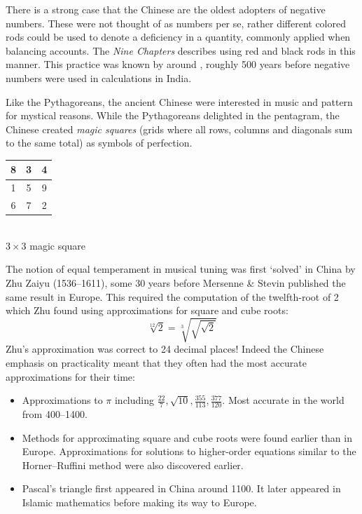 There is a strong case that the Chinese are the oldest adopters of negative numbers. These were not thought of as numbers per se, rather different colored rods could be used to denote a deficiency in a quantity, commonly applied when balancing accounts. The \emph{Nine Chapters} describes using red and black rods in this manner. This practice was known by around , roughly 500 years before negative numbers were used in calculations in India.
\smallskip


\begin{minipage}[t]{0.78\linewidth}\vspace{0pt}
 Like the Pythagoreans, the ancient Chinese were interested in music and pattern for mystical reasons. While the Pythagoreans delighted in the pentagram, the Chinese created \emph{magic squares} (grids where all rows, columns and diagonals sum to the same total) as symbols of perfection.
\end{minipage}\hfill\begin{minipage}[t]{0.2\linewidth}\vspace{0pt}
\centering\begin{tabular}{|c|c|c|}
\hline
8&3&4\\\hline
1&5&9\\\hline
6&7&2\\\hline
\end{tabular}\\[5pt]
$3\times 3$ magic square
\end{minipage}\smallbreak

The notion of equal temperament in musical tuning was first `solved' in China by Zhu Zaiyu (1536--1611), some 30 years before Mersenne \& Stevin published the same result in Europe. This required the computation of the twelfth-root of 2 which Zhu found using approximations for square and cube roots:
\[\sqrt[12]{2}=\sqrt[3]{\sqrt{\sqrt 2}}\]
Zhu's approximation was correct to 24 decimal places! Indeed the Chinese emphasis on practicality meant that they often had the most accurate approximations for their time:
\begin{itemize}
  \item Approximations to $\pi$ including $\frac{22}7,\sqrt{10},\frac{355}{113},\frac{377}{120}$. Most accurate in the world from 400--1400.
  \item Methods for approximating square and cube roots were found earlier than in Europe. Approximations for solutions to higher-order equations similar to the Horner--Ruffini method were also discovered earlier.
  \item Pascal's triangle first appeared in China around 1100. It later appeared in Islamic mathematics before making its way to Europe.
\end{itemize}
\goodbreak


